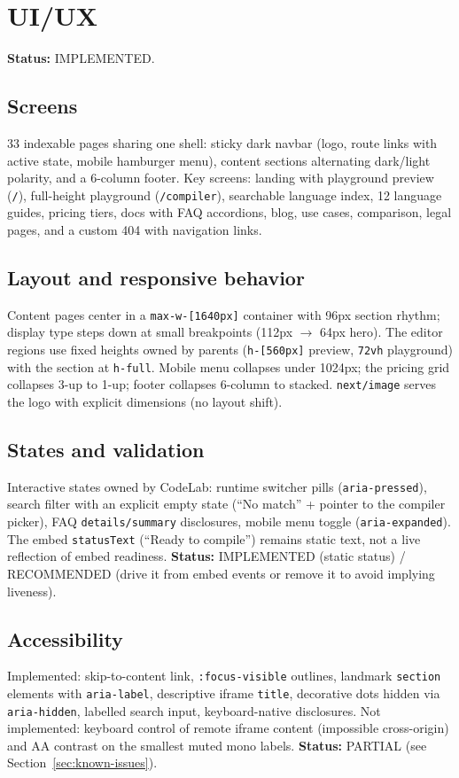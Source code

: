 \section{UI/UX}
\label{sec:ui-ux}

\textbf{Status:} IMPLEMENTED.

\subsection{Screens}
33 indexable pages sharing one shell: sticky dark navbar (logo, route links with active state, mobile hamburger menu), content sections alternating dark/light polarity, and a 6-column footer. Key screens: landing with playground preview (\texttt{/}), full-height playground (\texttt{/compiler}), searchable language index, 12 language guides, pricing tiers, docs with FAQ accordions, blog, use cases, comparison, legal pages, and a custom 404 with navigation links.

\subsection{Layout and responsive behavior}
Content pages center in a \texttt{max-w-[1640px]} container with 96px section rhythm; display type steps down at small breakpoints (112px $\rightarrow$ 64px hero). The editor regions use fixed heights owned by parents (\texttt{h-[560px]} preview, \texttt{72vh} playground) with the section at \texttt{h-full}. Mobile menu collapses under 1024px; the pricing grid collapses 3-up to 1-up; footer collapses 6-column to stacked. \texttt{next/image} serves the logo with explicit dimensions (no layout shift).

\subsection{States and validation}
Interactive states owned by CodeLab: runtime switcher pills (\texttt{aria-pressed}), search filter with an explicit empty state (``No match'' + pointer to the compiler picker), FAQ \texttt{details/summary} disclosures, mobile menu toggle (\texttt{aria-expanded}). The embed \texttt{statusText} (``Ready to compile'') remains static text, not a live reflection of embed readiness. \textbf{Status:} IMPLEMENTED (static status) / RECOMMENDED (drive it from embed events or remove it to avoid implying liveness).

\subsection{Accessibility}
Implemented: skip-to-content link, \texttt{:focus-visible} outlines, landmark \texttt{section} elements with \texttt{aria-label}, descriptive iframe \texttt{title}, decorative dots hidden via \texttt{aria-hidden}, labelled search input, keyboard-native disclosures. Not implemented: keyboard control of remote iframe content (impossible cross-origin) and AA contrast on the smallest muted mono labels. \textbf{Status:} PARTIAL (see Section~\ref{sec:known-issues}).
